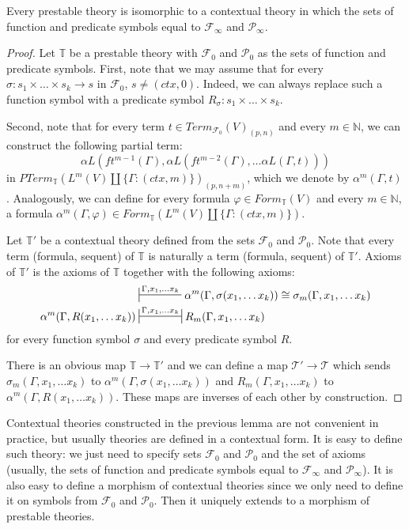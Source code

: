\documentclass[reqno]{amsart}
\theoremstyle{definition}
\theoremstyle{remark}
\numberwithin{figure}{section}
\begin{document}
\begin{lem}
Every prestable theory is isomorphic to a contextual theory in which the sets of function and predicate symbols equal to $\mathcal{F}_\infty$ and $\mathcal{P}_\infty$.
\end{lem}
\begin{proof}
Let $\mathbb{T}$ be a prestable theory with $\mathcal{F}_0$ and $\mathcal{P}_0$ as the sets of function and predicate symbols.
First, note that we may assume that for every $\sigma : s_1 \times \ldots \times s_k \to s$ in $\mathcal{F}_0$, $s \neq (ctx,0)$.
Indeed, we can always replace such a function symbol with a predicate symbol $R_\sigma : s_1 \times \ldots \times s_k$.

Second, note that for every term $t \in Term_{\mathcal{F}_0}(V)_{(p,n)}$ and every $m \in \mathbb{N}$, we can construct the following partial term:
\[ \alpha L(ft^{m-1}(\Gamma), \alpha L(ft^{m-2}(\Gamma), \ldots \alpha L(\Gamma, t))) \]
in $PTerm_{\mathbb{T}}(L^m(V) \amalg \{ \Gamma : (ctx,m) \})_{(p,n+m)}$, which we denote by $\alpha^m(\Gamma, t)$.
Analogously, we can define for every formula $\varphi \in Form_{\mathbb{T}}(V)$ and every $m \in \mathbb{N}$,
a formula $\alpha^m(\Gamma, \varphi) \in Form_{\mathbb{T}}(L^m(V) \amalg \{ \Gamma : (ctx,m) \})$.

Let $\mathbb{T}'$ be a contextual theory defined from the sets $\mathcal{F}_0$ and $\mathcal{P}_0$.
Note that every term (formula, sequent) of $\mathbb{T}$ is naturally a term (formula, sequent) of $\mathbb{T}'$.
Axioms of $\mathbb{T}'$ is the axioms of $\mathbb{T}$ together with the following axioms:
\begin{align*}
& \sststile{}{\Gamma, x_1, \ldots x_k} \alpha^m(\Gamma, \sigma(x_1, \ldots x_k)) \cong \sigma_m(\Gamma, x_1, \ldots x_k) \\
\alpha^m(\Gamma, R(x_1, \ldots x_k)) & \ssststile{}{\Gamma, x_1, \ldots x_k} R_m(\Gamma, x_1, \ldots x_k)
\end{align*}
for every function symbol $\sigma$ and every predicate symbol $R$.

There is an obvious map $\mathbb{T} \to \mathbb{T}'$ and we can define a map $\mathcal{T}' \to \mathcal{T}$
which sends $\sigma_m(\Gamma, x_1, \ldots x_k)$ to $\alpha^m(\Gamma, \sigma(x_1, \ldots x_k))$ and
$R_m(\Gamma, x_1, \ldots x_k)$ to $\alpha^m(\Gamma, R(x_1, \ldots x_k))$.
These maps are inverses of each other by construction.
\end{proof}

Contextual theories constructed in the previous lemma are not convenient in practice, but usually theories are defined in a contextual form.
It is easy to define such theory: we just need to specify sets $\mathcal{F}_0$ and $\mathcal{P}_0$ and the set of axioms
(usually, the sets of function and predicate symbols equal to $\mathcal{F}_\infty$ and $\mathcal{P}_\infty$).
It is also easy to define a morphism of contextual theories since we only need to define it on symbols from $\mathcal{F}_0$ and $\mathcal{P}_0$.
Then it uniquely extends to a morphism of prestable theories.
\end{document}
